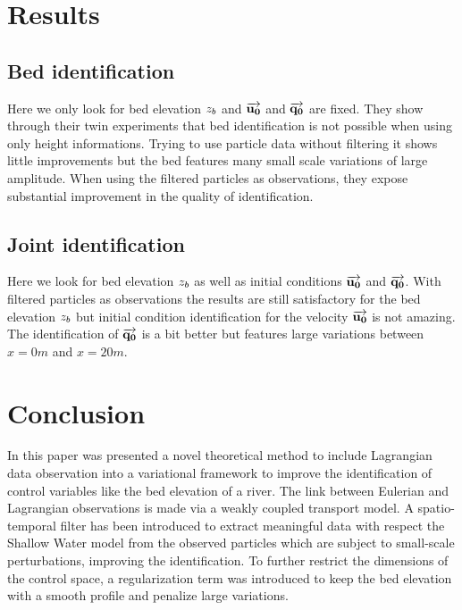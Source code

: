 \clearpage

\section{Results}
\subsection{Bed identification}
    
Here we only look for bed elevation $z_b$ and $\overrightarrow{\mathbf{u_0}}$ and $\overrightarrow{\mathbf{q_0}}$ are fixed.
They show through their twin experiments that bed identification is not possible when using only height informations. 
Trying to use particle data without filtering it shows little improvements but the bed features many small scale variations of large amplitude.
When using the filtered particles as observations, they expose substantial improvement in the quality of identification.

\subsection{Joint identification}
    
Here we look for bed elevation $z_b$ as well as initial conditions $\overrightarrow{\mathbf{u_0}}$ and $\overrightarrow{\mathbf{q_0}}$.
With filtered particles as observations the results are still satisfactory for the bed elevation $z_b$ but initial condition identification for the velocity $\overrightarrow{\mathbf{u_0}}$ is not amazing. The identification of $\overrightarrow{\mathbf{q_0}}$ is a bit better but features large variations between $x=0m$ and $x=20m$.

\section{Conclusion}

In this paper was presented a novel theoretical method to include Lagrangian data observation into a variational framework to improve the identification of control variables like the bed elevation of a river. The link between Eulerian and Lagrangian observations is made via a weakly coupled transport model. A spatio-temporal filter has been introduced to extract meaningful data with respect the Shallow Water model from the observed particles which are subject to small-scale perturbations, improving the identification. To further restrict the dimensions of the control space, a regularization term was introduced to keep the bed elevation with a smooth profile and penalize large variations. 






 
 
 
 
 
 
 
 
 
 
 
 
